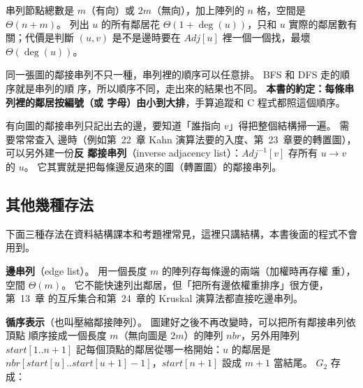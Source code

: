\begin{center}
\label{fig:gtr-adjlist}
\end{center}

串列節點總數是 $m$（有向）或 $2m$（無向），加上陣列的 $n$ 格，空間是 $\Theta(n + m)$。
列出 $u$ 的所有鄰居花 $\Theta(1 + \deg(u))$，只和 $u$ 實際的鄰居數有關；代價是判斷
$(u, v)$ 是不是邊時要在 $\mathit{Adj}[u]$ 裡一個一個找，最壞 $\Theta(\deg(u))$。

同一張圖的鄰接串列不只一種，串列裡的順序可以任意排。 BFS 和 DFS 走的順序就是串列的順
序，所以順序不同，走出來的結果也不同。 \textbf{本書的約定：每條串列裡的鄰居按編號（或
字母）由小到大排}，手算追蹤和 C 程式都照這個順序。

有向圖的鄰接串列只記出去的邊，要知道「誰指向 $v$」得把整個結構掃一遍。 需要常常查入
邊時（例如第~22~章 Kahn 演算法要的入度、第~23~章要的轉置圖），可以另外建一份\textbf{反
鄰接串列}（inverse adjacency list）：$\mathit{Adj}^{-1}[v]$ 存所有 $u \to v$ 的 $u$。
它其實就是把每條邊反過來的圖（轉置圖）的鄰接串列。

\subsection{其他幾種存法}

下面三種存法在資料結構課本和考題裡常見，這裡只講結構，本書後面的程式不會用到。

\textbf{邊串列}（edge list）。 用一個長度 $m$ 的陣列存每條邊的兩端（加權時再存權
重），空間 $\Theta(m)$。 它不能快速列出鄰居，但「把所有邊依權重排序」很方便，第~13~章
的互斥集合和第~24~章的 Kruskal 演算法都直接吃邊串列。

\textbf{循序表示}（也叫壓縮鄰接陣列）。 圖建好之後不再改變時，可以把所有鄰接串列依頂點
順序接成一個長度 $m$（無向圖是 $2m$）的陣列 $\mathit{nbr}$，另外用陣列
$\mathit{start}[1..n+1]$ 記每個頂點的鄰居從哪一格開始：$u$ 的鄰居是
$\mathit{nbr}[\mathit{start}[u] .. \mathit{start}[u+1] - 1]$，$\mathit{start}[n+1]$ 設成
$m + 1$ 當結尾。 $G_2$ 存成：

